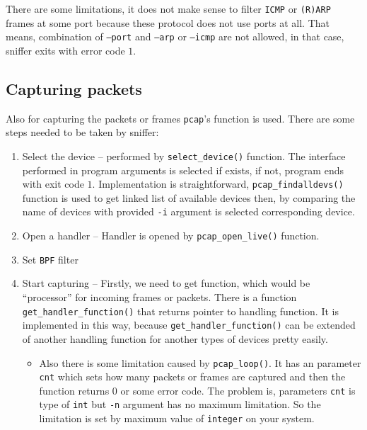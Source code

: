 \documentclass[11pt, a4paper]{article}
\begin{document}
            There are some limitations, it does not make sense to filter \texttt{ICMP} or \texttt{(R)ARP} frames at some port because these protocol does not use ports at all. That means, combination of \texttt{--port} and \texttt{--arp} or \texttt{--icmp} are not allowed, in that case, sniffer exits with error code $1$.
            
        \subsection{Capturing packets}
            Also for capturing the packets or frames \texttt{pcap}'s function is used. There are some steps needed to be taken by sniffer:
            \begin{enumerate}
                \item Select the device -- performed by \texttt{select\_device()} function. The interface performed in program arguments is selected if exists, if not, program ends with exit code $1$. Implementation is straightforward, \texttt{pcap\_findalldevs()} function is used to get linked list of available devices then, by comparing the name of devices with provided \texttt{-i} argument is selected corresponding device.
                \item Open a handler -- Handler is opened by \texttt{pcap\_open\_live()} function.
                \item Set \texttt{BPF} filter
                \item Start capturing -- Firstly, we need to get function, which would be ``processor'' for incoming frames or packets. There is a function \texttt{get\_handler\_function()} that returns pointer to handling function. It is implemented in this way, because \texttt{get\_handler\_function()} can be extended of another handling function for another types of devices pretty easily. 
                \begin{itemize}
                    \item Also there is some limitation caused by \texttt{pcap\_loop()}. It has an parameter \texttt{cnt}\cite{pcaploop} which sets how many packets or frames are captured and then the function returns $0$ or some error code. The problem is, parameters \texttt{cnt} is type of \texttt{int} but \texttt{-n} argument has no maximum limitation. So the limitation is set by maximum value of \texttt{integer} on your system.
                \end{itemize}
            \end{enumerate}
\end{document}
